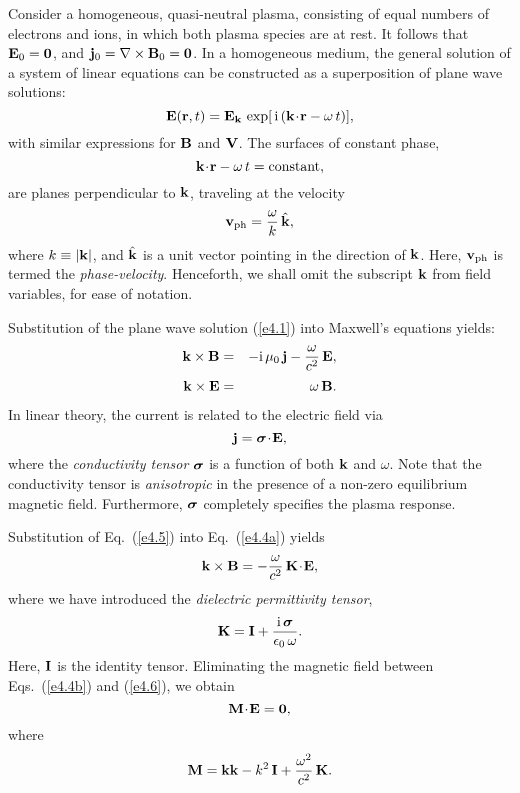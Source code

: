 Consider a homogeneous, quasi-neutral  plasma, consisting of equal
numbers of electrons and ions, in which both plasma species are at rest.
It follows that ${\bf E}_0 = {\bf 0}$, and ${\bf j}_0 =\nabla\times
{\bf B}_0 = {\bf 0}$. In a homogeneous medium, the
general solution of a system of linear equations can be constructed as
a superposition of plane wave solutions:
\begin{equation}\label{e4.1}
{\bf E} ({\bf r}, t) = {\bf E}_{\bf k} \,\exp[\,{\rm i}\,({\bf k}
\!\cdot\!{\bf r} - \omega\, t)],
\end{equation}
with similar expressions for ${\bf B}$ and ${\bf V}$. The
surfaces of constant phase,
\begin{equation}
{\bf k}\!\cdot\!{\bf r} - \omega\, t = {\rm constant},
\end{equation}
are planes perpendicular to ${\bf k}$, traveling at the velocity
\begin{equation}
{\bf v}_{\rm ph} = \frac{\omega}{k}\,\hat{\bf k},
\end{equation}
where $k\equiv |{\bf k}|$, and $\hat{\bf k}$ is a unit vector
pointing in the direction of ${\bf k}$. Here, ${\bf v}_{\rm ph}$
is termed the {\em phase-velocity}.
Henceforth, we shall omit
the subscript ${\bf k}$ from field variables, for ease of notation.


Substitution of the plane wave solution (\ref{e4.1}) into Maxwell's equations yields:
\begin{eqnarray}\label{e4.4a}
{\bf k}\times{\bf B} &=& - {\rm i}\,\mu_0\,{\bf j} - \frac{\omega}{c^2}\,{\bf E},
\\[0.5ex]
{\bf k}\times{\bf E} &=& \omega\,{\bf B}.\label{e4.4b}
\end{eqnarray}
In linear theory, the current is related to the electric field via
\begin{equation}\label{e4.5}
{\bf j} = \mbox{\boldmath$\sigma$}\!\cdot\!{\bf E},
\end{equation}
where the {\em conductivity tensor}\/ $\mbox{\boldmath$\sigma$}$ is a
function of both ${\bf k}$ and $\omega$. Note that the conductivity
tensor is {\em anisotropic}\/ in the presence of a non-zero  equilibrium
magnetic field. Furthermore, $\mbox{\boldmath$\sigma$}$ completely specifies the
plasma response. 

Substitution of Eq.~(\ref{e4.5}) into Eq.~(\ref{e4.4a}) yields
\begin{equation}\label{e4.6}
{\bf k}\times{\bf B} = -\frac{\omega}{c^2}\,{\bf K}\!\cdot\!{\bf E},
\end{equation}
where we have introduced the {\em dielectric permittivity tensor},
\begin{equation}\label{e4.7}
{\bf K} = {\bf I} + \frac{{\rm i}\,{\mbox{\boldmath$\sigma$}}}{\epsilon_0\,\omega}.
\end{equation}
Here, ${\bf I}$ is the identity tensor. Eliminating the
magnetic field between Eqs.~(\ref{e4.4b}) and (\ref{e4.6}), we obtain 
\begin{equation}\label{e4.8}
{\bf M}\!\cdot\!{\bf E} = {\bf 0},
\end{equation}
where
\begin{equation}\label{e4.9}
{\bf M} = {\bf k}{\bf k} - k^2\,{\bf I} + \frac{\omega^2}{c^2}\,
{\bf K}.
\end{equation}

